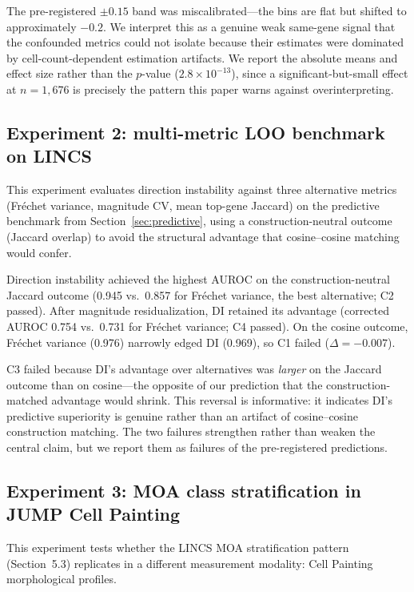 \documentclass[11pt]{article}
\begin{document}
The pre-registered $\pm 0.15$ band was miscalibrated---the bins are flat
but shifted to approximately $-0.2$. We interpret this as a genuine weak
same-gene signal that the confounded metrics could not isolate because
their estimates were dominated by cell-count-dependent estimation
artifacts. We report the absolute means and effect size rather than the
$p$-value ($2.8 \times 10^{-13}$), since a significant-but-small effect
at $n = 1{,}676$ is precisely the pattern this paper warns against
overinterpreting.

\subsection{Experiment 2: multi-metric LOO benchmark on LINCS}
\label{sec:benchmark}

This experiment evaluates direction instability against three alternative
metrics (Fr\'{e}chet variance, magnitude CV, mean top-gene Jaccard) on
the predictive benchmark from Section~\ref{sec:predictive}, using a
construction-neutral outcome (Jaccard overlap) to avoid the structural
advantage that cosine--cosine matching would confer.

Direction instability achieved the highest AUROC on the
construction-neutral Jaccard outcome (0.945 vs.\ 0.857 for Fr\'{e}chet
variance, the best alternative; C2 passed). After magnitude
residualization, DI retained its advantage (corrected AUROC 0.754 vs.\
0.731 for Fr\'{e}chet variance; C4 passed). On the cosine outcome,
Fr\'{e}chet variance (0.976) narrowly edged DI (0.969), so C1 failed
($\Delta = -0.007$).

C3 failed because DI's advantage over alternatives was \emph{larger} on
the Jaccard outcome than on cosine---the opposite of our prediction that
the construction-matched advantage would shrink. This reversal is
informative: it indicates DI's predictive superiority is genuine rather
than an artifact of cosine--cosine construction matching. The two
failures strengthen rather than weaken the central claim, but we report
them as failures of the pre-registered predictions.

\subsection{Experiment 3: MOA class stratification in JUMP Cell Painting}

This experiment tests whether the LINCS MOA stratification pattern
(Section~5.3) replicates in a different measurement modality: Cell
Painting morphological profiles.
\end{document}
